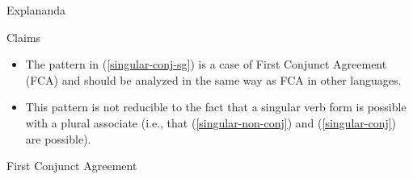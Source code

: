 \documentclass[final]{beamer}
\newlength{\onecolwid}
\begin{document}
\begin{frame}[t]
\begin{columns}[t]
\begin{column}{\onecolwid}
\begin{block}{Explananda}
\end{block}

\begin{alertblock}{Claims}
\begin{itemize}
\item The pattern in  (\ref{singular-conj-sg}) is a case of First Conjunct Agreement (FCA) and should be analyzed in the same way as FCA in other languages.
\item This pattern is not reducible to the fact that a singular verb form is possible with a plural associate (i.e., that (\ref{singular-non-conj}) and (\ref{singular-conj}) are possible). 
\end{itemize}

\end{alertblock}

\begin{block}{First Conjunct Agreement}\vspace{0.5em}


\end{block}
\end{column}
\end{columns}
\end{frame}
\end{document}
